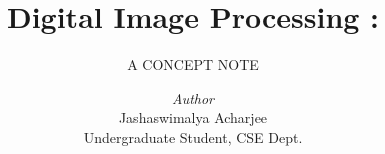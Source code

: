 \documentclass[a4paper, 12pt]{report}
\institute{National Institute of Technology\\Agartala}
\title{Digital Image Processing :}
\subtitle{A CONCEPT NOTE}
\author{\textit{Author}\\Jashaswimalya Acharjee\\Undergraduate Student, CSE Dept.}
\date{}
\begin{document}
    \maketitle
    \romantableofcontents

	
	\cleardoublepage
	
	\cleardoublepage
	
	\cleardoublepage
    
\end{document}
